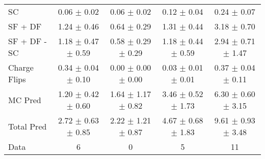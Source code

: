 \begin{tabular}{l|cccc}
                                 SC &  0.06 $\pm$  0.02 &  0.06 $\pm$  0.02 &  0.12 $\pm$  0.04 &  0.24 $\pm$  0.07 \\
                            SF + DF &  1.24 $\pm$  0.46 &  0.64 $\pm$  0.29 &  1.31 $\pm$  0.44 &  3.18 $\pm$  0.70 \\
\hline
                       SF + DF - SC &  1.18 $\pm$  0.47 $\pm$  0.59 &  0.58 $\pm$  0.29 $\pm$  0.29 &  1.18 $\pm$  0.44 $\pm$  0.59 &  2.94 $\pm$  0.71 $\pm$  1.47 \\
\hline\hline
                       Charge Flips &  0.34 $\pm$  0.04 $\pm$  0.10 &  0.00 $\pm$  0.00 $\pm$  0.00 &  0.03 $\pm$  0.01 $\pm$  0.01 &  0.37 $\pm$  0.04 $\pm$  0.11 \\
\hline
                            MC Pred &  1.20 $\pm$  0.42 $\pm$  0.60 &  1.64 $\pm$  1.17 $\pm$  0.82 &  3.46 $\pm$  0.52 $\pm$  1.73 &  6.30 $\pm$  0.60 $\pm$  3.15 \\
\hline
                         Total Pred &  2.72 $\pm$  0.63 $\pm$  0.85 &  2.22 $\pm$  1.21 $\pm$  0.87 &  4.67 $\pm$  0.68 $\pm$  1.83 &  9.61 $\pm$  0.93 $\pm$  3.48 \\
\hline\hline
                               Data &     6 &     0 &     5 &    11 \\
\hline\hline
\end{tabular}

